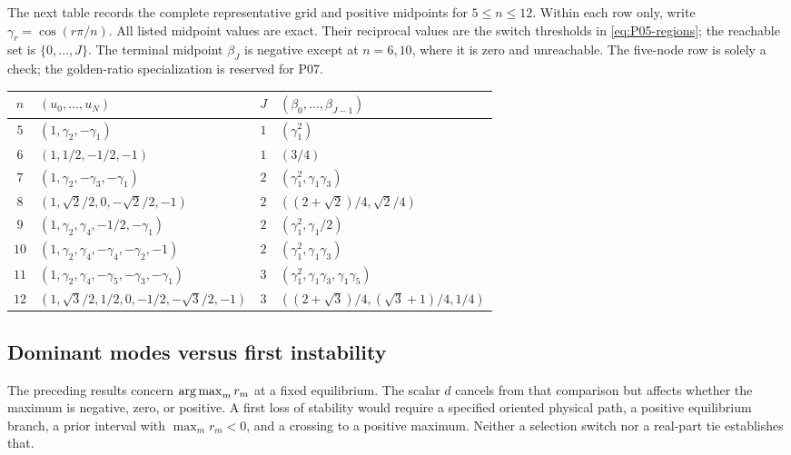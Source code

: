 The next table records the complete representative grid and positive
midpoints for $5\le n\le12$. Within each row only, write
$\gamma_r=\cos(r\pi/n)$. All listed midpoint values are exact.
Their reciprocal values are the switch thresholds in
\eqref{eq:P05-regions}; the reachable set is $\{0,\ldots,J\}$.
The terminal midpoint $\beta_J$ is negative except at $n=6,10$,
where it is zero and unreachable. The five-node row is solely a check;
the golden-ratio specialization is reserved for P07.
\begin{center}
\small
\renewcommand{\arraystretch}{1.3}
\begin{tabular}{@{}c l c l@{}}
\toprule
$n$ & $(u_0,\ldots,u_N)$ & $J$ & $(\beta_0,\ldots,\beta_{J-1})$\\
\midrule
$5$ & $(1,\gamma_2,-\gamma_1)$ & $1$ & $(\gamma_1^2)$\\
$6$ & $(1,1/2,-1/2,-1)$ & $1$ & $(3/4)$\\
$7$ & $(1,\gamma_2,-\gamma_3,-\gamma_1)$ & $2$ & $(\gamma_1^2,\gamma_1\gamma_3)$\\
$8$ & $(1,\sqrt2/2,0,-\sqrt2/2,-1)$ & $2$ & $((2+\sqrt2)/4,\sqrt2/4)$\\
$9$ & $(1,\gamma_2,\gamma_4,-1/2,-\gamma_1)$ & $2$ & $(\gamma_1^2,\gamma_1/2)$\\
$10$ & $(1,\gamma_2,\gamma_4,-\gamma_4,-\gamma_2,-1)$ & $2$ & $(\gamma_1^2,\gamma_1\gamma_3)$\\
$11$ & $(1,\gamma_2,\gamma_4,-\gamma_5,-\gamma_3,-\gamma_1)$ & $3$ & $(\gamma_1^2,\gamma_1\gamma_3,\gamma_1\gamma_5)$\\
$12$ & $(1,\sqrt3/2,1/2,0,-1/2,-\sqrt3/2,-1)$ & $3$ & $((2+\sqrt3)/4,(\sqrt3+1)/4,1/4)$\\
\bottomrule
\end{tabular}
\end{center}

\subsection{Dominant modes versus first instability}

The preceding results concern $\operatorname*{arg\,max}_m r_m$ at a fixed equilibrium.
The scalar $d$ cancels from that comparison but affects whether the
maximum is negative, zero, or positive. A first loss of stability would
require a specified oriented physical path, a positive equilibrium branch,
a prior interval with $\max_m r_m<0$, and a crossing to a positive
maximum. Neither a selection switch nor a real-part tie establishes that.

